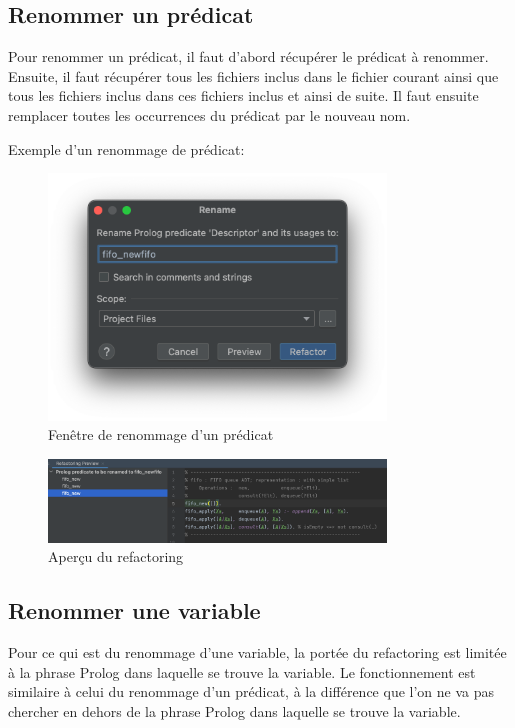 \subsection{Renommer un prédicat}
\noindent Pour renommer un prédicat, il faut d'abord récupérer le prédicat à renommer.
Ensuite, il faut récupérer tous les fichiers inclus dans le fichier courant ainsi que tous les fichiers inclus dans ces
fichiers inclus et ainsi de suite.
\newdoubleline
Il faut ensuite remplacer toutes les occurrences du prédicat par le nouveau nom.
\newdoubleline

Exemple d'un renommage de prédicat:

\begin{figure}[H]
    \centering
    \includegraphics[width=0.8\textwidth]{images/Refactor_window.png}
    \caption{Fenêtre de renommage d'un prédicat}
    \label{fig:refactor_window}
\end{figure}

\begin{figure}[H]
    \centering
    \includegraphics[width=0.8\textwidth]{images/Refactoring_preview.png}
    \caption{Aperçu du refactoring}
    \label{fig:refactor_preview}
\end{figure}

\subsection{Renommer une variable}
\noindent Pour ce qui est du renommage d'une variable, la portée du refactoring est limitée à la phrase Prolog dans laquelle se trouve la variable.
\newdoubleline
Le fonctionnement est similaire à celui du renommage d'un prédicat, à la différence que l'on ne va pas chercher en dehors de la phrase Prolog dans laquelle se trouve la variable.

